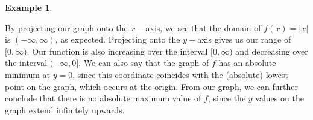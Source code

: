 \documentclass[12pt]{book}
\theoremstyle{definition}
\newtheorem{example}{Example}
\begin{document}
\begin{example}
\begin{center}
\end{center}
\end{example}
By projecting our graph onto the $x-$axis, we see that the domain of $f(x)=|x|$ is $(-\infty, \infty)$, as expected.  Projecting onto the $y-$axis gives us our range of $[0,\infty)$.  Our function is also increasing over the interval $[0,\infty)$ and decreasing over the interval $(-\infty,0]$.
We can also say that the graph of $f$ has an absolute minimum at $y=0$, since this coordinate coincides with the (absolute) lowest point on the graph, which occurs at the origin.  From our graph, we can further conclude that there is no absolute maximum value of $f$, since the $y$ values on the graph extend infinitely upwards.
\end{document}
